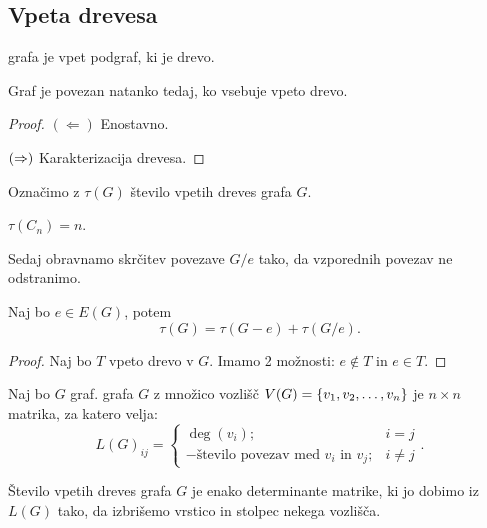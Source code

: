 \subsection{Vpeta drevesa}
\begin{definicija}
     grafa je vpet podgraf, ki je drevo.
\end{definicija}

\begin{trditev}
    Graf je povezan natanko tedaj, ko vsebuje vpeto drevo.
\end{trditev}

\begin{proof}
    $(\Leftarrow)$ Enostavno.

    $(\Rightarrow)$ Karakterizacija drevesa.
\end{proof}

Označimo z $\tau(G)$ število vpetih dreves grafa $G$.
\begin{primer}
    $\tau(C_n) = n$.
\end{primer}

\begin{opomba}
    Sedaj obravnamo skrčitev povezave $G/e$ tako, da vzporednih povezav ne odstranimo.
\end{opomba}

\begin{trditev}
    Naj bo $e \in E(G)$, potem $$\tau(G) = \tau(G-e) + \tau (G/e).$$
\end{trditev}

\begin{proof}
    Naj bo $T$ vpeto drevo v $G$. Imamo 2 možnosti: $e \notin T$ in $e \in T$.
\end{proof}

\begin{definicija}
    Naj bo $G$ graf.  grafa $G$ z množico vozlišč $V(G) = \left\{v_1, v_2, \ldots, v_n\right\}$ je $n \times n$ matrika, za katero velja: $$L(G)_{ij} = \begin{cases}
        \deg(v_i); &i=j \\ - \text{število povezav med $v_i$ in $v_j$}; &i \neq j
    \end{cases}.$$
\end{definicija}

\begin{izrek}
    Število vpetih dreves grafa $G$ je enako determinante matrike, ki jo dobimo iz $L(G)$ tako, da izbrišemo vrstico in stolpec nekega vozlišča.
\end{izrek}

